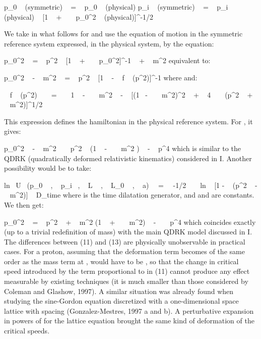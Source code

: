 \documentclass[a4paper,12pt,dvips]{article}
\begin{document}
\equation
p_{0} ~ (symmetric) ~ = ~ p_{0} ~ (physical)
\endequation
\equation
p_{i} ~ (symmetric) ~ = ~ p_{i} ~ (physical) 
~ [1 ~ + ~ \epsilon ~ p_0^2 ~ (physical)]^{-1/2}
\endequation

We take in what follows \coordHE{} for \coordHE{} and use the equation of motion in the symmetric reference system expressed, in the physical system, by the equation:

\equation
p_{0}^2 ~ = ~ p^2 ~ [1 ~ + ~ \epsilon ~ p_0^2]^{-1} ~ + ~ m^2
\endequation
\noindent
equivalent to: 

\equation
p_{0}^2 ~ - ~ m^2 ~ = ~ p^2 ~ [1 ~ - ~ f ~ (p^2)]^{-1}
\endequation
\noindent
where \coordHE{} and:

 ~ f ~ (p^2) ~ ~ = ~  ~ 1 ~ - ~ \epsilon ~ m^2 ~ - ~ [(1~ - ~ \epsilon ~ m^2)^2 ~ + ~ 4 ~ \epsilon ~ (p^2 ~ + ~ m^2)]^{1/2}
\endequation

This expression defines the hamiltonian \coordHE{} in the physical reference system. For \coordHE{}, it gives:

\equation
p_{0}^2 ~ - ~ m^2 ~ \simeq ~ p^2 ~ (1 ~ - ~ \epsilon ~ m^2 ) ~ - ~ \epsilon p^4 
\endequation
\noindent
which is similar to the QDRK (quadratically deformed relativistic kinematics) considered in I. Another possibility would be to take:

\equation
ln ~U~ (p_0 ~ , ~ p_i ~, ~ L ~ , ~ L_0 ~ , ~ a)~~ =~~ -1/2 ~ ~ ln ~ [1 - ~ \epsilon (p^2 ~ - ~ m^2)] ~ D_{time}
\endequation
\noindent
where \coordHE{} is the time dilatation generator, and \coordHE{} and \coordHE{} are constants. We then get:

\equation
p_{0}^2 ~ = ~ p^2 ~ + ~ m^2 (1 ~ + ~ \epsilon ~ m^2) ~ - ~ \epsilon ~ p^4 
\endequation
\noindent
which coincides exactly (up to a trivial redefinition of mass) with the main QDRK model discussed in I. The differences between (11) and (13) are physically unobservable in practical cases. For a proton, assuming that the deformation term becomes of the same order as the mass term at \coordHE{}, \coordHE{} would have to be \coordHE{} , so that the change in critical speed introduced by the term proportional to \coordHE{} in (11) cannot produce any effect measurable by existing techniques (it is much smaller than those considered by Coleman and Glashow, 1997). A similar situation was already found when studying the sine-Gordon equation discretized with a one-dimensional space lattice with spacing \coordHE{} (Gonzalez-Mestres, 1997 a and b). A perturbative expansion in powers of  \coordHE{}  for the lattice equation brought the same kind of deformation of the critical speeds.
\end{document}
